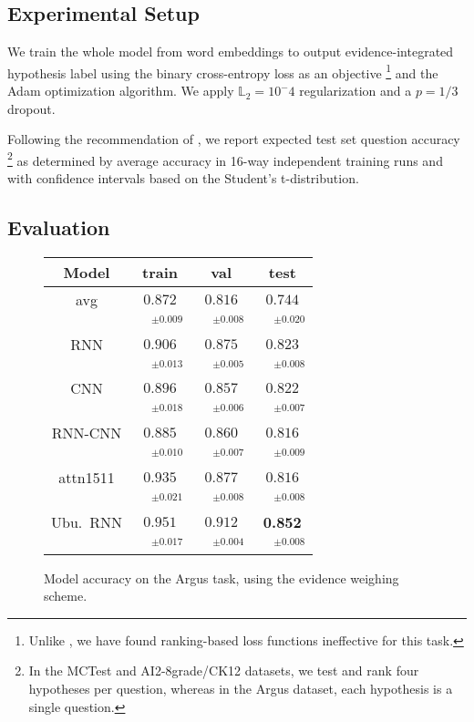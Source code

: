 \documentclass[11pt]{article}
\begin{document}
\subsection{Experimental Setup}

We train the whole model from word embeddings to output evidence-integrated
hypothesis label using the binary cross-entropy loss as an objective%
\footnote{Unlike \cite{HABCNN}, we have found ranking-based loss functions
	ineffective for this task.}
and the Adam optimization algorithm.  We apply $\mathbb{L}_2 = 10^-4$
regularization and a $p=1/3$ dropout.

Following the recommendation of \cite{sps}, we report expected test set
question accuracy%
\footnote{In the MCTest and AI2-8grade/CK12 datasets, we test and rank four
	hypotheses per question, whereas in the Argus dataset, each
	hypothesis is a single question.}
as determined by average accuracy in 16-way independent training runs
and with confidence intervals based on the Student's
t-distribution.

\subsection{Evaluation}

\begin{figure}[t]
\centering
\setlength{\tabcolsep}{3pt}
\begin{tabular}{|c|c|c|c|}
\hline
Model              & train & val & test \\
\hline
avg & $0.872$ & $0.816$ & $0.744$\\
 & $\quad^{\pm0.009}$ & $\quad^{\pm0.008}$ & $\quad^{\pm0.020}$\\
\hline
RNN & $0.906$ & $0.875$ & $0.823$\\
 & $\quad^{\pm0.013}$ & $\quad^{\pm0.005}$ & $\quad^{\pm0.008}$\\
CNN & $0.896$ & $0.857$ & $0.822$\\
 & $\quad^{\pm0.018}$ & $\quad^{\pm0.006}$ & $\quad^{\pm0.007}$\\
RNN-CNN & $0.885$ & $0.860$ & $0.816$\\
 & $\quad^{\pm0.010}$ & $\quad^{\pm0.007}$ & $\quad^{\pm0.009}$\\
attn1511 & $0.935$ & $0.877$ & $0.816$\\
 & $\quad^{\pm0.021}$ & $\quad^{\pm0.008}$ & $\quad^{\pm0.008}$\\
Ubu.\ RNN & $0.951$ & $0.912$ & \textbf{0.852}\\
 & $\quad^{\pm0.017}$ & $\quad^{\pm0.004}$ & $\quad^{\pm0.008}$\\
\hline
\end{tabular}
\setlength{\tabcolsep}{6pt}
\vspace*{-0.2cm}
\caption{\footnotesize%
	Model accuracy on the Argus task, using the evidence weighing scheme.
}
\label{tab:argus}
\end{figure}
\end{document}
